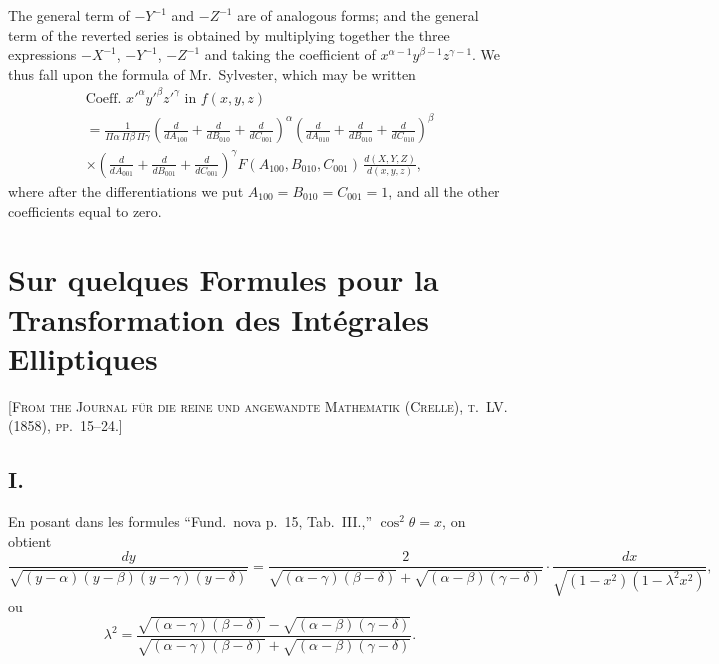 \documentclass[11pt,a4paper]{book}
\begin{document}
The general term of $-Y^{-1}$ and $-Z^{-1}$ are of analogous forms; and the general term of the reverted series is obtained by multiplying together the three expressions $-X^{-1}$, $-Y^{-1}$, $-Z^{-1}$ and taking the coefficient of $x^{\alpha-1}y^{\beta-1}z^{\gamma-1}$. We thus fall upon the formula of Mr.~Sylvester, which may be written
\begin{multline*}
\text{Coeff. } x'^\alpha y'^\beta z'^\gamma \text{ in } f(x,y,z) \\
= \frac{1}{\Pi\alpha\,\Pi\beta\,\Pi\gamma}
\left(
\frac{d}{dA_{100}} + \frac{d}{dB_{010}} + \frac{d}{dC_{001}}
\right)^\alpha
\left(
\frac{d}{dA_{010}} + \frac{d}{dB_{010}} + \frac{d}{dC_{010}}
\right)^\beta \\
\times\left(
\frac{d}{dA_{001}} + \frac{d}{dB_{001}} + \frac{d}{dC_{001}}
\right)^\gamma
F(A_{100},B_{010},C_{001})\,\frac{d(X,Y,Z)}{d(x,y,z)},
\end{multline*}
where after the differentiations we put $A_{100}=B_{010}=C_{001}=1$, and all the other coefficients equal to zero.

\newpage



\section{Sur quelques Formules pour la Transformation des Intégrales Elliptiques}

\textsc{[From the Journal für die reine und angewandte Mathematik (Crelle), t.~LV. (1858), pp.~15--24.]}
\label{paper:235}

\setcounter{page}{61}

\subsection*{I.}

En posant dans les formules ``Fund.\ nova p.~15, Tab.~III.,'' $\cos^2\theta = x$, on obtient
\[
\frac{dy}{\sqrt{(y-\alpha)(y-\beta)(y-\gamma)(y-\delta)}}
= \frac{2}{\sqrt{(\alpha-\gamma)(\beta-\delta)} + \sqrt{(\alpha-\beta)(\gamma-\delta)}} \cdot \frac{dx}{\sqrt{(1-x^2)(1-\lambda^2x^2)}},
\]
ou
\[
\lambda^2 = \frac{\sqrt{(\alpha-\gamma)(\beta-\delta)} - \sqrt{(\alpha-\beta)(\gamma-\delta)}}{\sqrt{(\alpha-\gamma)(\beta-\delta)} + \sqrt{(\alpha-\beta)(\gamma-\delta)}}.
\]
\end{document}
